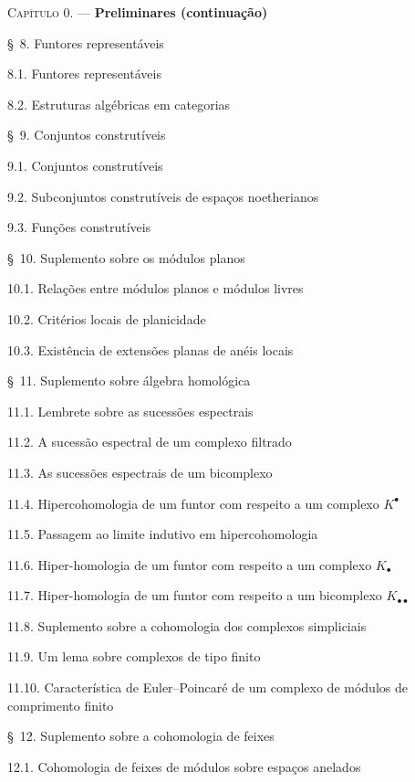 \begin{flushleft}
\textsc{Capítulo 0.} --- \textbf{Preliminares (continuação)} 

\medskip
\S~8. Funtores representáveis 

8.1. Funtores representáveis 

8.2. Estruturas algébricas em categorias 

\medskip
\S~9. Conjuntos construtíveis 

9.1. Conjuntos construtíveis 

9.2. Subconjuntos construtíveis de espaços noetherianos 

9.3. Funções construtíveis 

\medskip
\S~10. Suplemento sobre os módulos planos 

10.1. Relações entre módulos planos e módulos livres 

10.2. Critérios locais de planicidade 

10.3. Existência de extensões planas de anéis locais 

\medskip
\S~11. Suplemento sobre álgebra homológica 

11.1. Lembrete sobre as sucessões espectrais 

11.2. A sucessão espectral de um complexo filtrado 

11.3. As sucessões espectrais de um bicomplexo 

11.4. Hipercohomologia de um funtor com respeito a um complexo $K^\bullet$

11.5. Passagem ao limite indutivo em hipercohomologia 

11.6. Hiper-homologia de um funtor com respeito a um complexo $K_\bullet$

11.7. Hiper-homologia de um funtor com respeito a um bicomplexo
$K_{\bullet\bullet}$ 

11.8. Suplemento sobre a cohomologia dos complexos simpliciais 

11.9. Um lema sobre complexos de tipo finito 

11.10. Característica de Euler--Poincaré de um complexo de módulos de comprimento finito

\medskip
\S~12. Suplemento sobre a cohomologia de feixes 

12.1. Cohomologia de feixes de módulos sobre espaços anelados 


\end{flushleft}
